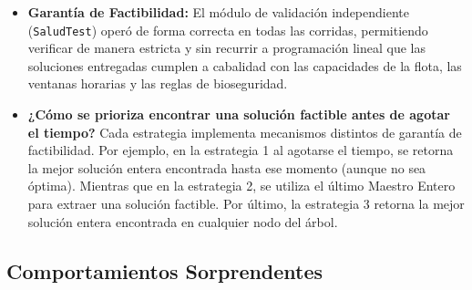 \documentclass[12pt]{article}
\numberwithin{algorithm}{section}
\begin{document}
\begin{itemize}
    \item \textbf{Garantía de Factibilidad:} El módulo de validación independiente (\texttt{SaludTest}) operó de forma correcta en todas las corridas, permitiendo verificar de manera estricta y sin recurrir a programación lineal que las soluciones entregadas cumplen a cabalidad con las capacidades de la flota, las ventanas horarias y las reglas de bioseguridad.
    \item \textbf{¿Cómo se prioriza encontrar una solución factible antes de agotar el tiempo?} Cada estrategia implementa mecanismos distintos de garantía de factibilidad. Por ejemplo, en la estrategia 1 al agotarse el tiempo, se retorna la mejor solución entera encontrada hasta ese momento (aunque no sea óptima). Mientras que en la estrategia 2, se utiliza el último Maestro Entero para extraer una solución factible. Por último, la estrategia 3 retorna la mejor solución entera encontrada en cualquier nodo del árbol.
\end{itemize}

\subsection{Comportamientos Sorprendentes}
\end{document}
